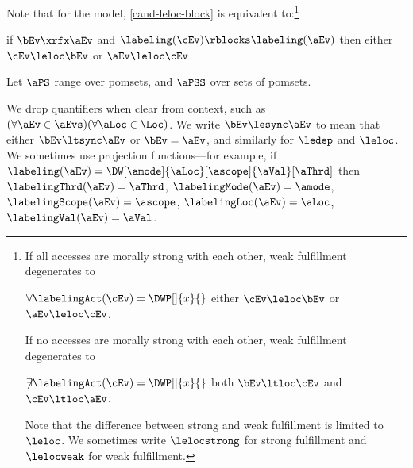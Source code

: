 Note that for the \IMM{} model, \ref{cand-leloc-block} is equivalent to:\footnote{If all accesses are morally strong with each other, weak fulfillment
  degenerates to
  \begin{scope}
    $\forall\labelingAct(\cEv)=\DWP[]{x}{}$ either
    $\cEv \leloc \bEv$ or $\aEv \leloc \cEv$.
  \end{scope}
  If no accesses are morally strong with each other, weak fulfillment
  degenerates to
  \begin{scope}
    $\not\mkern-5mu\exists\labelingAct(\cEv)=\DWP[]{x}{}$ 
    both $\bEv \ltloc \cEv$ and $\cEv \ltloc \aEv$.
  \end{scope}
  Note that the difference between strong and weak fulfillment is limited to $\leloc$.
  We sometimes write $\lelocstrong$ for strong fulfillment and
  $\lelocweak$ for weak fulfillment.}
\begin{center}
  if $\bEv\xrfx\aEv$ and $\labeling(\cEv) \rblocks \labeling(\aEv)$ then
  either $\cEv\leloc\bEv$ or $\aEv\leloc\cEv$.
\end{center}





Let $\aPS$ range over pomsets, and $\aPSS$ over sets of pomsets.

We drop quantifiers
when clear from context, such as
$(\forall\aEv\in\aEvs)(\forall\aLoc\in\Loc)$.
We write $\bEv\lesync\aEv$ to mean that either $\bEv\ltsync\aEv$ or $\bEv=\aEv$, and similarly
for $\ledep$ and $\leloc$.
We sometimes use projection functions---for example, if
$\labeling(\aEv)=\DW[\amode]{\aLoc}[\ascope]{\aVal}[\aThrd]$ then 
$\labelingThrd(\aEv)=\aThrd$,
$\labelingMode(\aEv)=\amode$,
$\labelingScope(\aEv)=\ascope$,
$\labelingLoc(\aEv)=\aLoc$,
$\labelingVal(\aEv)=\aVal$.

